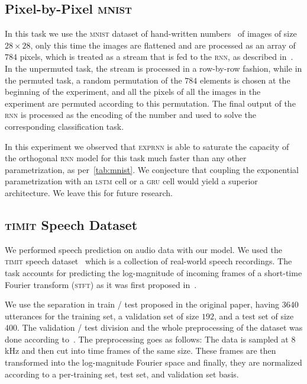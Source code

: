 \subsection{Pixel-by-Pixel \textsc{mnist}}
In this task we use the \textsc{mnist} dataset of hand-written numbers~\cite{lecun-mnisthandwrittendigit-2010} of images of size $28 \times 28$, only this time the images are flattened and are processed as an array of $784$ pixels, which is treated as a stream that is fed to the \textsc{rnn}, as described in~\cite{le2015simple}. In the unpermuted task, the stream is processed in a row-by-row fashion, while in the permuted task, a random permutation of the $784$ elements is chosen at the beginning of the experiment, and all the pixels of all the images in the experiment are permuted according to this permutation. The final output of the \textsc{rnn} is processed as the encoding of the number and used to solve the corresponding classification task.

In this experiment we observed that \textsc{exprnn} is able to saturate the capacity of the orthogonal \textsc{rnn} model for this task much faster than any other parametrization, as per~\ref{tab:mnist}.
We conjecture that coupling the exponential parametrization with an \textsc{lstm} cell or a \textsc{gru} cell would yield a superior architecture. We leave this for future research.

\subsection{\textsc{timit} Speech Dataset} We performed speech prediction on audio data with our model. We used the \textsc{timit} speech dataset~\cite{garofolo1992timit} which is a collection of real-world speech recordings. The task accounts for predicting the log-magnitude of incoming frames of a short-time Fourier transform (\textsc{stft}) as it was first proposed in~\cite{wisdom2016full}.

We use the separation in train / test proposed in the original paper, having $3640$ utterances for the training set, a validation set of size $192$, and a test set of size $400$. The validation / test division and the whole preprocessing of the dataset was done according to~\cite{wisdom2016full}. The preprocessing goes as follows: The data is sampled at $8$kHz and then cut into time frames of the same size. These frames are then transformed into the log-magnitude Fourier space and finally, they are normalized according to a per-training set, test set, and validation set basis.

